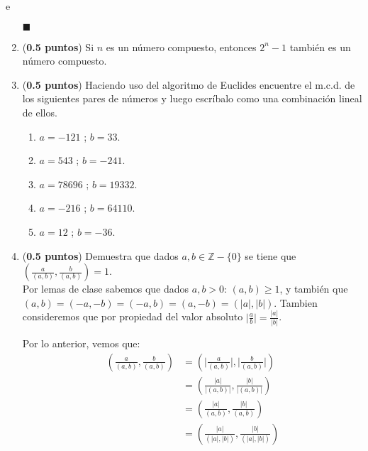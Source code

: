 e\documentclass[fontsize=12pt]{scrartcl}
\providecommand{\abs}[1]{\lvert#1\rvert}
\begin{document}
\begin{enumerate}
                        \begin{flushright}
                          $\blacksquare$
                        \end{flushright}

		
		\item ({\bf 0.5 puntos}) Si $n$ es un n\'umero compuesto, entonces 
		$2^{n} - 1$ tambi\'en es un n\'umero compuesto.
		

	
		\item ({\bf 0.5 puntos}) Haciendo uso del algoritmo de Euclides encuentre 
		el m.c.d. de los siguientes pares de n\'umeros y luego escr\'ibalo 
		como una combinaci\'on lineal de ellos.
			\begin{enumerate}
				\item $a = -121$ ; $b = 33$.
				\item $a = 543$ ; $b = -241 $.
				\item $a = 78696$ ; $b = 19332$.
				\item $a = -216$ ; $b = 64110$.
				\item $a = 12$ ; $b = -36$.
			\end{enumerate}

	   	 \item ({\bf 0.5 puntos})  Demuestra que dados $a, b \in \mathbb{Z}-\{0\}$ 
		   se tiene que $\left( \frac{a}{(a,b)}, \frac{b}{(a,b)} \right ) = 1$. \\
                   Por lemas de clase sabemos que dados $a, b >0$: $(a,b) \geq 1$, y también que $(a, b) = (-a, -b) = (-a, b) = (a,-b) = ( \abs{a}, \abs{b})$. Tambien consideremos que por propiedad del valor absoluto $ \abs {\frac{a}{b}} = \frac{\abs{a}}{\abs{b}}$.

                   Por lo anterior, vemos que:
                  \begin{equation*}
                    \begin{split}
                      \left( \frac{a}{(a,b)}, \frac{b}{(a,b)} \right) &= \left(\abs{\frac{a}{(a,b)}},\abs{\frac{b}{(a,b)}}\right) \\
                      &= \left( \frac{\abs {a} } { \abs {(a,b) } } ,\frac{\abs{b}}{\abs{(a,b)}} \right)   \\
                      &= \left( \frac{\abs {a} } { (a,b)  } ,\frac{\abs{b}}{(a,b)} \right) \\
                      &= \left( \frac{\abs {a} } { (\abs{a},\abs{b})  }, \frac{\abs{b}}{(\abs{a},\abs{b})} \right) \\
                    \end{split}
                  \end{equation*}


\end{enumerate}
\end{document}
